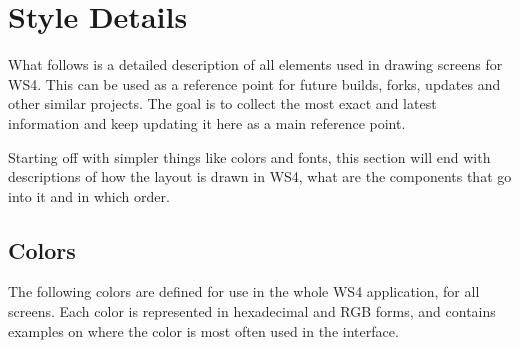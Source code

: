 \documentclass[a4paper,11pt]{refart}
\begin{document}
\newpage
\section{Style Details}

What follows is a detailed description of all elements used in drawing screens for WS4. This can be used as a reference point for future builds, forks, updates and other similar projects. The goal is to collect the most exact and latest information and keep updating it here as a main reference point.

Starting off with simpler things like colors and fonts, this section will end with descriptions of how the layout is drawn in WS4, what are the components that go into it and in which order.

\subsection{Colors}

The following colors are defined for use in the whole WS4 application, for all screens. Each color is represented in hexadecimal and RGB forms, and contains examples on where the color is most often used in the interface.
\end{document}
